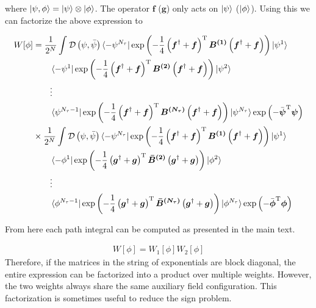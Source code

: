 \documentclass{article}
\begin{document}
where $\ket{\psi,\phi} = \ket{\psi} \otimes\ket{\phi}$. The operator $\boldsymbol{f}$ ($\boldsymbol{g}$) only acts on $\ket{\psi}$ ($\ket{\phi}$). Using this we can factorize the above expression to

\begin{align}
W[\phi] &= \frac{1}{2^N}\int_{ }^{ } \mathcal{D}\left(\psi,\bar{\psi} \right)\bra{-\psi^{N_\tau}} \exp \left( -\frac{1}{4}\left(\boldsymbol{f}^\dagger + \boldsymbol{f} \right)^\mathrm{T} \boldsymbol{B^{(1)}}\left(\boldsymbol{f}^\dagger + \boldsymbol{f} \right)  \right) \ket{\psi^1} \nonumber \\
&\quad\quad \bra{-\psi^{1}} \exp \left( -\frac{1}{4}\left(\boldsymbol{f}^\dagger + \boldsymbol{f} \right)^\mathrm{T} \boldsymbol{B^{(2)}}\left(\boldsymbol{f}^\dagger + \boldsymbol{f} \right)  \right) \ket{\psi^2}\nonumber \\
&\quad\quad \vdots \nonumber \\
&\quad\quad \bra{\psi^{N_\tau-1}} \exp \left( -\frac{1}{4}\left(\boldsymbol{f}^\dagger + \boldsymbol{f} \right)^\mathrm{T} \boldsymbol{B^{(N_\tau)}}\left(\boldsymbol{f}^\dagger + \boldsymbol{f} \right)  \right) \ket{\psi^{N_\tau}} \exp \left( - \bar{\boldsymbol{\psi} }^\mathrm{T} \boldsymbol{\psi}  \right) \nonumber \\
&\times \frac{1}{2^N}\int_{ }^{ } \mathcal{D}\left(\psi,\bar{\psi} \right)\bra{-\psi^{N_\tau}} \exp \left( -\frac{1}{4}\left(\boldsymbol{f}^\dagger + \boldsymbol{f} \right)^\mathrm{T} \boldsymbol{B^{(1)}}\left(\boldsymbol{f}^\dagger + \boldsymbol{f} \right)  \right) \ket{\psi^1} \nonumber \\
&\quad\quad \bra{-\phi^{1}} \exp \left( -\frac{1}{4}\left(\boldsymbol{g}^\dagger + \boldsymbol{g} \right)^\mathrm{T} \boldsymbol{\bar{B}^{(2)}}\left(\boldsymbol{g}^\dagger + \boldsymbol{g} \right)  \right) \ket{\phi^2}\nonumber \\
&\quad\quad \vdots \nonumber \\
&\quad\quad \bra{\phi^{N_\tau-1}} \exp \left( -\frac{1}{4}\left(\boldsymbol{g}^\dagger + \boldsymbol{g} \right)^\mathrm{T} \boldsymbol{\bar{B}^{(N_\tau)}}\left(\boldsymbol{g}^\dagger + \boldsymbol{g} \right)  \right) \ket{\phi^{N_\tau}} \exp \left( - \bar{\boldsymbol{\phi} }^\mathrm{T} \boldsymbol{\phi}  \right)
\end{align}

From here each path integral can be computed as presented in the main text. 

\begin{align}
W[\phi] = W_1[\phi]W_2[\phi]
\end{align}
Therefore, if the matrices in the string of exponentials are block diagonal, the entire expression can be factorized into a product over multiple weights. However, the two weights always share the same auxiliary field configuration. This factorization is sometimes useful to reduce the sign problem.
\end{document}
